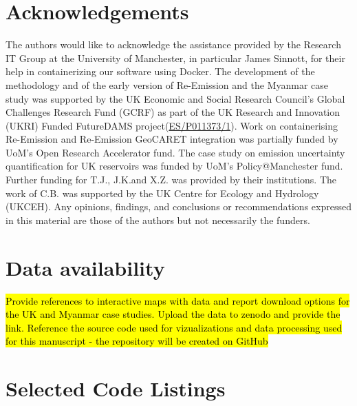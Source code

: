 \documentclass[final,1p,times]{elsarticle}
\let\oldappendix\appendix
\renewcommand{\appendix}{%
    \oldappendix
    \setcounter{figure}{0}
    \setcounter{table}{0}
    \setcounter{equation}{0}
    \setcounter{lstlisting}{0}
    
    \renewcommand{\thefigure}{A.\arabic{figure}}
    \renewcommand{\thetable}{A.\arabic{table}}
    \renewcommand{\theequation}{A.\arabic{equation}}
    \renewcommand{\thelstlisting}{A.\arabic{lstlisting}}
  }
\begin{document}
\section{Acknowledgements}
The authors would like to acknowledge the assistance provided by the Research IT Group at the University of Manchester, in particular James Sinnott, for their help in containerizing our software using Docker.
The development of the methodology and of the early version of Re-Emission and the Myanmar case study was supported by the UK Economic and Social Research Council's Global Challenges Research Fund (GCRF) as part of the UK Research and Innovation (UKRI) Funded FutureDAMS project(\href{www.futuredams.org}{ES/P011373/1}).
Work on containerising Re-Emission and Re-Emission GeoCARET integration was partially funded by UoM's Open Research Accelerator fund.
The case study on emission uncertainty quantification for UK reservoirs was funded by UoM's Policy@Manchester fund.
Further funding for T.J., J.K.and X.Z. was provided by their institutions. 
The work of C.B. was supported by the UK Centre for Ecology and Hydrology (UKCEH). 
Any opinions, findings, and conclusions or recommendations expressed in this material are those of the authors but not necessarily the funders.

\section{Data availability}
\hl{Provide references to interactive maps with data and report download options for the UK and Myanmar case studies. Upload the data to zenodo and provide the link. Reference the source code used for vizualizations and data processing used for this manuscript - the repository will be created on GitHub}

\appendix

\section{Selected Code Listings}
\label{app1}
\end{document}
